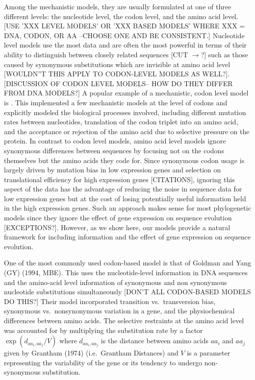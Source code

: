 \documentclass[13pt]{article}
\begin{document}
Among the mechanistic models, they are usually formulated at one of three different levels: the nucleotide level, the codon level, and the amino acid level.
[USE 'XXX LEVEL MODELS'  OR 'XXX BASED MODELS' WHERE XXX = DNA, CODON, OR AA --CHOOSE ONE AND BE CONSISTENT.]
Nucleotide level models use the most data and are often the most powerful in terms of their ability to distinguish between closely related sequences [CUT $\rightarrow$?] such as those caused by synonymous substitutions which are invisible at amino acid level [WOULDN''T THIS APPLY TO CODON-LEVEL MODELS AS WELL?].
[DISCUSSION OF CODON LEVEL MODELS-- HOW DO THEY DIFFER FROM DNA MODELS?]
A popular example of a mechanistic, codon level model is \citet{YangEtAl98}.
This implemented a few mechanistic models at the level of codons and explicitly modeled the biological processes involved, including different mutation rates between nucleotides, translation of the codon triplet into an amino acid, and the acceptance or rejection of the amino acid due to selective pressure on the protein. 
In contrast to codon level models, amino acid level models ignore synonymous differences between sequences by focusing not on the codons themselves but the amino acids they code for.
Since synonymous codon usage is largely driven by mutation bias in low expression genes and selection on translational efficiency for high expression genes [CITATIONS], ignoring this aspect of the data has the advantage of reducing the noise in sequence data for low expression genes but at the cost of losing potentially useful information held in the high expression genes.
Such an approach makes sense for most phylogenetic models since they ignore the effect of gene expression on sequence evolution [EXCEPTIONS?].
However, as we show here, our models provide a natural framework for including information and the effect of gene expression on sequence evolution.


One of the most commonly used codon-based model is that of Goldman and Yang (GY) (1994, MBE).
This uses the nucleotide-level information in DNA sequences and the amino-acid level information of synonymous and non synonymous nucleotide substitutions simultaneously [DON'T ALL CODON-BASED MODELS DO THIS?]
Their model incorporated transition vs.~transversion bias, synonymous vs.~nonsynonymous variation in a gene, and the physiochemical differences between amino acids.
The selective restraints at the amino acid level was accounted for by multiplying the substitution rate by a factor $\exp (d_{aa_i,aa_j}/V)$ where $d_{aa_i, aa_j}$ is the distance between amino acids $aa_i$ and $aa_j$ given by Grantham (1974) (i.e.~Grantham Distances) and $V$ is a parameter representing the variability of the gene or its tendency to undergo non-synonymous substitution.
\end{document}
